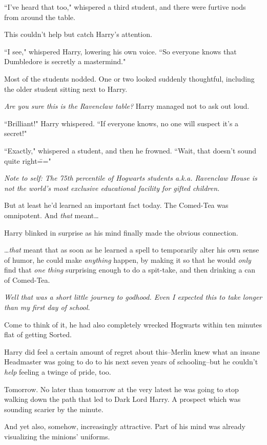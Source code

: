 ``I've heard that too," whispered a third student, and there were furtive nods from around the table.

This couldn't help but catch Harry's attention.

``I see," whispered Harry, lowering his own voice. ``So everyone knows that Dumbledore is secretly a mastermind."

Most of the students nodded. One or two looked suddenly thoughtful, including the older student sitting next to Harry.

\emph{Are you sure this is the Ravenclaw table?} Harry managed not to ask out loud.

``Brilliant!" Harry whispered. ``If everyone knows, no one will suspect it's a secret!"

``Exactly," whispered a student, and then he frowned. ``Wait, that doesn't sound quite right\==="

\emph{Note to self: The 75th percentile of Hogwarts students a.k.a. Ravenclaw House is not the world's most exclusive educational facility for gifted children.}

But at least he'd learned an important fact today. The Comed-Tea was omnipotent. And \emph{that} meant{\ldots}

Harry blinked in surprise as his mind finally made the obvious connection.

{\ldots}\emph{that} meant that as soon as he learned a spell to temporarily alter his own sense of humor, he could make \emph{anything} happen, by making it so that he would \emph{only} find that \emph{one thing} surprising enough to do a spit-take, and then drinking a can of Comed-Tea.

\emph{Well that was a short little journey to godhood. Even I expected this to take longer than my first day of school.}

Come to think of it, he had also completely wrecked Hogwarts within ten minutes flat of getting Sorted.

Harry did feel a certain amount of regret about this\---Merlin knew what an insane Headmaster was going to do to his next seven years of schooling\---but he couldn't \emph{help} feeling a twinge of pride, too.

Tomorrow. No later than tomorrow at the very latest he was going to stop walking down the path that led to Dark Lord Harry. A prospect which was sounding scarier by the minute.

And yet also, somehow, increasingly attractive. Part of his mind was already visualizing the minions' uniforms.

